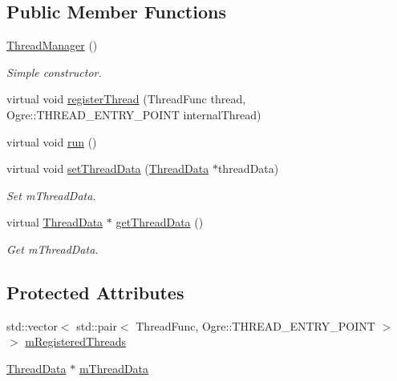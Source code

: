 \subsection*{Public Member Functions}
\begin{DoxyCompactItemize}
\item 
\mbox{\label{class_common_1_1_thread_manager_a7179821ef1420e23e7f87a5f62cd443a}} 
\hyperlink{class_common_1_1_thread_manager_a7179821ef1420e23e7f87a5f62cd443a}{Thread\+Manager} ()
\begin{DoxyCompactList}\small\item\em Simple constructor. \end{DoxyCompactList}\item 
virtual void \hyperlink{class_common_1_1_thread_manager_a79a947a3ff5c8a34e51cc41007832aeb}{register\+Thread} (Thread\+Func thread, Ogre\+::\+T\+H\+R\+E\+A\+D\+\_\+\+E\+N\+T\+R\+Y\+\_\+\+P\+O\+I\+NT internal\+Thread)
\item 
virtual void \hyperlink{class_common_1_1_thread_manager_adeceb4a130b2a8987e724dfda0efccbb}{run} ()
\item 
\mbox{\label{class_common_1_1_thread_manager_aed92881e192cdfb4ab3d28c465f3a900}} 
virtual void \hyperlink{class_common_1_1_thread_manager_aed92881e192cdfb4ab3d28c465f3a900}{set\+Thread\+Data} (\hyperlink{struct_common_1_1_thread_data}{Thread\+Data} $\ast$thread\+Data)
\begin{DoxyCompactList}\small\item\em Set m\+Thread\+Data. \end{DoxyCompactList}\item 
\mbox{\label{class_common_1_1_thread_manager_aaad49e99ae379d164451cb3cbae002eb}} 
virtual \hyperlink{struct_common_1_1_thread_data}{Thread\+Data} $\ast$ \hyperlink{class_common_1_1_thread_manager_aaad49e99ae379d164451cb3cbae002eb}{get\+Thread\+Data} ()
\begin{DoxyCompactList}\small\item\em Get m\+Thread\+Data. \end{DoxyCompactList}\end{DoxyCompactItemize}
\subsection*{Protected Attributes}
\begin{DoxyCompactItemize}
\item 
std\+::vector$<$ std\+::pair$<$ Thread\+Func, Ogre\+::\+T\+H\+R\+E\+A\+D\+\_\+\+E\+N\+T\+R\+Y\+\_\+\+P\+O\+I\+NT $>$ $>$ \hyperlink{class_common_1_1_thread_manager_a92ea3cda744e1e89df5b27111caed238}{m\+Registered\+Threads}
\item 
\hyperlink{struct_common_1_1_thread_data}{Thread\+Data} $\ast$ \hyperlink{class_common_1_1_thread_manager_a2a3cc720d802c7270f36bbb69fc19a98}{m\+Thread\+Data}
\end{DoxyCompactItemize}


